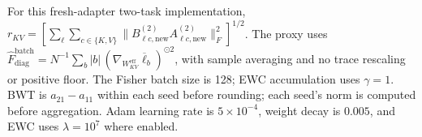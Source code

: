 \begin{table}[t]
\begin{tabular*}{\textwidth}{@{\extracolsep{\fill}}lccccccccc@{}}
\bottomrule
\end{tabular*}
\par\smallskip
\begin{minipage}{\textwidth}\scriptsize
For this fresh-adapter two-task implementation,
$r_{KV}=[\sum_{\ell}\sum_{c\in\{K,V\}}\|B^{(2)}_{\ell c,\mathrm{new}}
A^{(2)}_{\ell c,\mathrm{new}}\|_F^2]^{1/2}$.
The proxy uses
$\widehat F^{\mathrm{batch}}_{\mathrm{diag}}
=N^{-1}\sum_b |b|\,(\nabla_{W^{\mathrm{eff}}_{KV}}\overline{\ell}_b)^{\odot2}$,
with sample averaging and no trace rescaling or positive floor.
The Fisher batch size is 128; EWC accumulation uses $\gamma=1$.
BWT is $a_{21}-a_{11}$ within each seed before rounding;
each seed's norm is computed before aggregation.
Adam learning rate is $5\times10^{-4}$, weight decay is $0.005$,
and EWC uses $\lambda=10^7$ where enabled.
\end{minipage}
\end{table}
